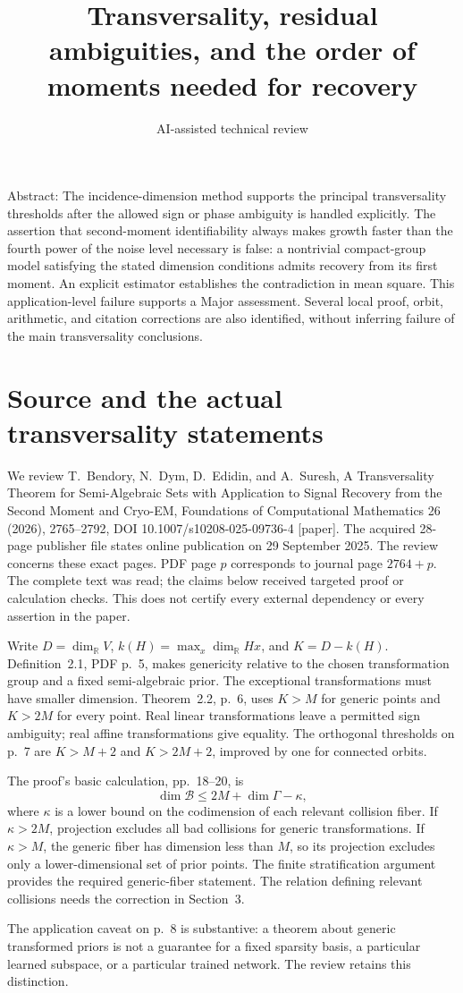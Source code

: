 \documentclass[10pt]{article}
\title{Transversality, residual ambiguities, and the order of moments needed for recovery}
\author{AI-assisted technical review}
\date{}
\begin{document}
\maketitle
Abstract: The incidence-dimension method supports the principal transversality thresholds after the allowed sign or phase ambiguity is handled explicitly. The assertion that second-moment identifiability always makes growth faster than the fourth power of the noise level necessary is false: a nontrivial compact-group model satisfying the stated dimension conditions admits recovery from its first moment. An explicit estimator establishes the contradiction in mean square. This application-level failure supports a Major assessment. Several local proof, orbit, arithmetic, and citation corrections are also identified, without inferring failure of the main transversality conclusions.\par
\section*{Source and the actual transversality statements}
We review T. Bendory, N. Dym, D. Edidin, and A. Suresh, A Transversality Theorem for Semi-Algebraic Sets with Application to Signal Recovery from the Second Moment and Cryo-EM, Foundations of Computational Mathematics 26 (2026), 2765–2792, DOI 10.1007/s10208-025-09736-4 [paper]. The acquired 28-page publisher file states online publication on 29 September 2025. The review concerns these exact pages. PDF page \(p\) corresponds to journal page \(2764+p\). The complete text was read; the claims below received targeted proof or calculation checks. This does not certify every external dependency or every assertion in the paper.\par
Write \(D=\dim_{\mathbb R}V\), \(k(H)=\max_x\dim_{\mathbb R}Hx\), and \(K=D-k(H)\). Definition 2.1, PDF p. 5, makes genericity relative to the chosen transformation group and a fixed semi-algebraic prior. The exceptional transformations must have smaller dimension. Theorem 2.2, p. 6, uses \(K>M\) for generic points and \(K>2M\) for every point. Real linear transformations leave a permitted sign ambiguity; real affine transformations give equality. The orthogonal thresholds on p. 7 are \(K>M+2\) and \(K>2M+2\), improved by one for connected orbits.\par
The proof’s basic calculation, pp. 18–20, is \[\dim\mathcal B\le 2M+\dim\Gamma-\kappa,\] where \(\kappa\) is a lower bound on the codimension of each relevant collision fiber. If \(\kappa>2M\), projection excludes all bad collisions for generic transformations. If \(\kappa>M\), the generic fiber has dimension less than \(M\), so its projection excludes only a lower-dimensional set of prior points. The finite stratification argument provides the required generic-fiber statement. The relation defining relevant collisions needs the correction in Section 3.\par
The application caveat on p. 8 is substantive: a theorem about generic transformed priors is not a guarantee for a fixed sparsity basis, a particular learned subspace, or a particular trained network. The review retains this distinction.\par
\end{document}
